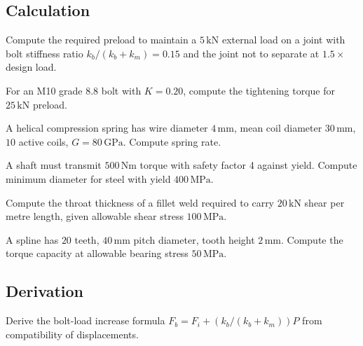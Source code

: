 \subsection*{Calculation}

\begin{exercise}
Compute the required preload to maintain a $5\,\si{\kilo\newton}$ external load on a joint with bolt stiffness ratio $k_b/(k_b+k_m) = 0.15$ and the joint not to separate at $1.5\times$ design load.
\end{exercise}

\begin{exercise}
For an M10 grade 8.8 bolt with $K = 0.20$, compute the tightening torque for $25\,\si{\kilo\newton}$ preload.
\end{exercise}

\begin{exercise}
A helical compression spring has wire diameter $4\,\si{\milli\meter}$, mean coil diameter $30\,\si{\milli\meter}$, $10$ active coils, $G = 80\,\si{\giga\pascal}$. Compute spring rate.
\end{exercise}

\begin{exercise}
A shaft must transmit $500\,\si{\newton\meter}$ torque with safety factor 4 against yield. Compute minimum diameter for steel with yield $400\,\si{\mega\pascal}$.
\end{exercise}

\begin{exercise}
Compute the throat thickness of a fillet weld required to carry $20\,\si{\kilo\newton}$ shear per metre length, given allowable shear stress $100\,\si{\mega\pascal}$.
\end{exercise}

\begin{exercise}
A spline has $20$ teeth, $40\,\si{\milli\meter}$ pitch diameter, tooth height $2\,\si{\milli\meter}$. Compute the torque capacity at allowable bearing stress $50\,\si{\mega\pascal}$.
\end{exercise}

\subsection*{Derivation}

\begin{exercise}
Derive the bolt-load increase formula $F_b = F_i + (k_b/(k_b+k_m))P$ from compatibility of displacements.
\end{exercise}

